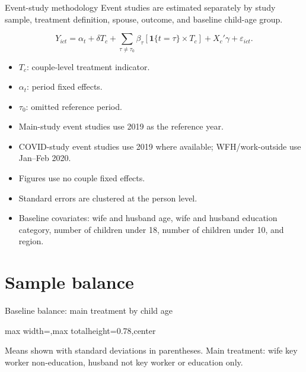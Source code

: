 \documentclass[aspectratio=169,11pt]{beamer}
\begin{document}
\begin{frame}{Event-study methodology}
\small
Event studies are estimated separately by study sample, treatment definition, spouse, outcome, and baseline child-age group.

\vspace{0.4em}
\[
Y_{ict}
=
\alpha_t
+
\delta T_c
+
\sum_{\tau \neq \tau_0}
\beta_{\tau}
\left[
\mathbf{1}\{t=\tau\}\times T_c
\right]
+
X_c'\gamma
+
\varepsilon_{ict}.
\]

\vspace{0.2em}
\scriptsize
\begin{itemize}
  \item \(T_c\): couple-level treatment indicator.
  \item \(\alpha_t\): period fixed effects.
  \item \(\tau_0\): omitted reference period.
  \item Main-study event studies use 2019 as the reference year.
  \item COVID-study event studies use 2019 where available; WFH/work-outside use Jan--Feb 2020.
  \item Figures use no couple fixed effects.
  \item Standard errors are clustered at the person level.
  \item Baseline covariates: wife and husband age, wife and husband education category, number of children under 18, number of children under 10, and region.
\end{itemize}

\end{frame}

\section{Sample balance}

\begin{frame}{Baseline balance: main treatment by child age}
\centering
\scriptsize
\begin{adjustbox}{max width=\linewidth,max totalheight=0.78\textheight,center}

\end{adjustbox}

\vspace{0.3em}
\tiny Means shown with standard deviations in parentheses. Main treatment: wife key worker non-education, husband not key worker or education only.
\end{frame}
\end{document}
